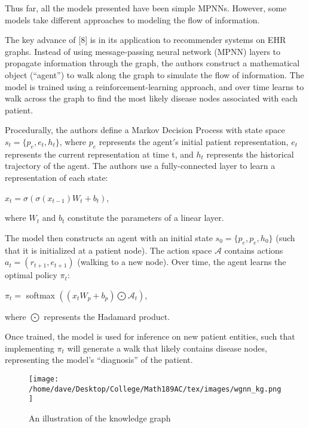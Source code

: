 \documentclass{article}
\begin{document}
Thus far, all the models presented have been simple MPNNs. However, some models take different approaches to modeling the flow of information. 

The key advance of [8] is in its application to recommender systems on EHR graphs. Instead of using message-passing neural network (MPNN) layers to propagate information through the graph, the authors construct a mathematical object (“agent”) to walk along the graph to simulate the flow of information. The model is trained using a reinforcement-learning approach, and over time learns to walk across the graph to find the most likely disease nodes associated with each patient.

Procedurally, the authors define a Markov Decision Process with state space $s_t = \{p_e,e_t,h_t\}$, where $p_e$ represents the agent$'$s initial patient representation, $e_t$ represents the current representation at time t, and $h_t$ represents the historical trajectory of the agent. The authors use a fully-connected layer to learn a representation of each state:

\begin{center}
$x_t = \sigma(\sigma(x_{t-1})W_t + b_t)$,
\end{center}

where $W_t$ and $b_t$ constitute the parameters of a linear layer. 

The model then constructs an agent with an initial state $s_0 = \{p_e,p_e,h_0\}$ (such that it is initialized at a patient node). The action space $\mathcal{A}$ contains actions $a_t = (r_{t+1},e_{t+1})$ (walking to a new node). Over time, the agent learns the optimal policy $\pi_t$:

\begin{center}
$\pi_t = $ softmax $((x_tW_p + b_p)  \bigodot \mathcal{A}_t)$,
\end{center} where $\bigodot$ represents the Hadamard product. 

Once trained, the model is used for inference on new patient entities, such that 
implementing $\pi_t$ will generate a walk that likely contains disease nodes, representing the model's “diagnosis” of the patient.


\begin{figure} [htbp!]
\centering
	\caption{An illustration of the knowledge graph}
        \texttt{[image: /home/dave/Desktop/College/Math189AC/tex/images/wgnn\_kg.png]}
    \end{figure}
    
\end{document}
